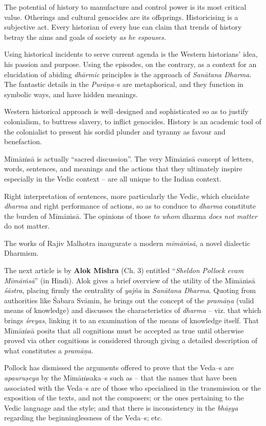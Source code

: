  The potential of history to manufacture and control power is its most critical value. Otherings and cultural genocides are its offsprings. Historicising is a subjective act. Every historian of every hue can claim that trends of history betray the aims and goals of society \textit{as he espouses.}

Using historical incidents to serve current agenda is the Western historians’ idea, his passion and purpose. Using the episodes, on the contrary, as a context for an elucidation of abiding \textit{dhārmic} principles is the approach of \textit{Sanātana Dharma}. The fantastic details in the \textit{Purāṇa}–s are metaphorical, and they function in symbolic ways, and have hidden meanings.

Western historical approach is well–designed and sophisticated so as to justify colonialism, to buttress slavery, to inflict genocides. History is an academic tool of the colonialist to present his sordid plunder and tyranny as favour and benefaction.

Mīmāṁsā is actually “sacred discussion”. The very Mīmāṁsā concept of letters, words, sentences, and meanings and the actions that they ultimately inspire especially in the Vedic context – are all unique to the Indian context.

Right interpretation of sentences, more particularly the Vedic, which elucidate \textit{dharma} and right performance of actions, so as to conduce to \textit{dharma} constitute the burden of Mīmāṁsā. The opinions of those \textit{to whom} dharma \textit{does not matter} do not matter.

The works of Rajiv Malhotra inaugurate a modern \textit{mīmāṁsā}, a novel dialectic Dharmism.

The next article is by \textbf{Alok Mishra} (Ch. 3) entitled “\textit{Sheldon Pollock evam Mīmāṁsā}” (in Hindi). Alok gives a brief overview of the utility of the Mīmāṁsā \textit{śāstra}, placing firmly the centrality of \textit{yajña} in \textit{Sanātana Dharma}. Quoting from authorities like Śabara Svāmin, he brings out the concept of the \textit{pramāṇa} (valid means of knowledge) and discusses the characteristics of \textit{dharma} – viz. that which brings \textit{śreyas}, linking it to an examination of the means of knowledge itself. That Mīmāṁsā posits that all cognitions must be accepted as true until otherwise proved via other cognitions is considered through giving a detailed description of what constitutes a \textit{pramāṇa}.

Pollock has dismissed the arguments offered to prove that the Veda–s are \textit{apauruṣeya} by the Mīmāṁsaka–s such as – that the names that have been associated with the Veda–s are of those who specialised in the transmission or the exposition of the texts, and not the composers; or the ones pertaining to the Vedic language and the style; and that there is inconsistency in the \textit{bhāṣya} regarding the beginninglessness of the Veda–s; etc.

